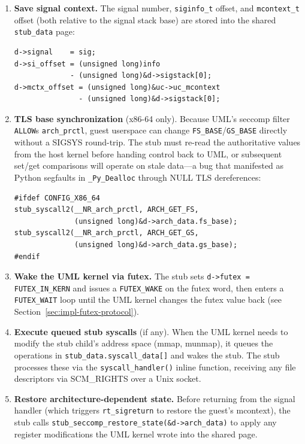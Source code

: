\begin{enumerate}
\item \textbf{Save signal context.}  The signal number, \texttt{siginfo\_t}
  offset, and \texttt{mcontext\_t} offset (both relative to the signal stack
  base) are stored into the shared \texttt{stub\_data} page:
\begin{lstlisting}[language=KernelC,numbers=none]
d->signal    = sig;
d->si_offset = (unsigned long)info
             - (unsigned long)&d->sigstack[0];
d->mctx_offset = (unsigned long)&uc->uc_mcontext
               - (unsigned long)&d->sigstack[0];
\end{lstlisting}

\item \textbf{TLS base synchronization} (x86-64 only).  Because UML's
  seccomp filter \texttt{ALLOW}s \texttt{arch\_prctl}, guest userspace can
  change \texttt{FS\_BASE}/\texttt{GS\_BASE} directly without a SIGSYS
  round-trip.  The stub must re-read the authoritative values from the host
  kernel before handing control back to UML, or subsequent set/get comparisons
  will operate on stale data---a bug that manifested as Python segfaults in
  \texttt{\_Py\_Dealloc} through NULL TLS dereferences:
\begin{lstlisting}[language=KernelC,numbers=none]
#ifdef CONFIG_X86_64
stub_syscall2(__NR_arch_prctl, ARCH_GET_FS,
              (unsigned long)&d->arch_data.fs_base);
stub_syscall2(__NR_arch_prctl, ARCH_GET_GS,
              (unsigned long)&d->arch_data.gs_base);
#endif
\end{lstlisting}

\item \textbf{Wake the UML kernel via futex.}  The stub sets
  \texttt{d->futex = FUTEX\_IN\_KERN} and issues a
  \texttt{FUTEX\_WAKE} on the futex word, then enters a
  \texttt{FUTEX\_WAIT} loop until the UML kernel changes the futex value
  back (see Section~\ref{sec:impl-futex-protocol}).

\item \textbf{Execute queued stub syscalls} (if any).  When the UML kernel
  needs to modify the stub child's address space (mmap, munmap), it queues
  the operations in \texttt{stub\_data.syscall\_data[]} and wakes the stub.
  The stub processes these via the \texttt{syscall\_handler()} inline function,
  receiving any file descriptors via SCM\_RIGHTS over a Unix socket.

\item \textbf{Restore architecture-dependent state.}  Before returning from
  the signal handler (which triggers \texttt{rt\_sigreturn} to restore the
  guest's mcontext), the stub calls
  \texttt{stub\_seccomp\_restore\_state(\&d->arch\_data)} to apply any
  register modifications the UML kernel wrote into the shared page.
\end{enumerate}

